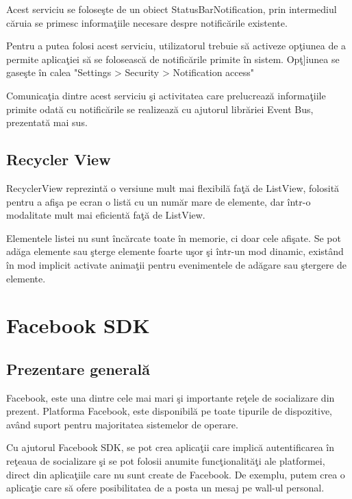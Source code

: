 	Acest serviciu se folose\c{s}te de un obiect StatusBarNotification, prin intermediul c\u{a}ruia se primesc informa\c{t}iile necesare despre notific\u{a}rile existente.

	Pentru a putea folosi acest serviciu, utilizatorul trebuie s\u{a} activeze op\c{t}iunea de a permite aplica\c{t}iei s\u{a} se foloseasc\u{a} de notific\u{a}rile primite \^{i}n sistem. Op\c{t]}iunea se gase\c{s}te \^{i}n calea "Settings > Security > Notification access"

Comunica\c{t}ia dintre acest serviciu \c{s}i activitatea care prelucreaz\u{a} informa\c{t}iile primite odat\u{a} cu notific\u{a}rile se realizeaz\u{a} cu ajutorul libr\u{a}riei Event Bus, prezentat\u{a} mai sus.

\subsection{Recycler View}

RecyclerView reprezint\u{a} o versiune mult mai flexibil\u{a} fa\c{t}\u{a} de ListView, folosit\u{a} pentru a afi\c{s}a pe ecran o list\u{a} cu un num\u{a}r mare de elemente, dar \^{i}ntr-o modalitate mult mai eficient\u{a} fa\c{t}\u{a} de ListView.

	Elementele listei nu sunt \^{i}nc\u{a}rcate toate \^{i}n memorie, ci doar cele afi\c{s}ate. Se pot ad\u{a}ga elemente sau \c{s}terge elemente foarte u\c{s}or \c{s}i \^{i}ntr-un mod dinamic, exist\^{a}nd \^{i}n mod implicit activate anima\c{t}ii pentru evenimentele de ad\u{a}gare sau \c{s}tergere de elemente.  


\section{Facebook SDK}

\subsection{Prezentare general\u{a}}
\label{facebookSDK}
Facebook, este una dintre cele mai mari \c{s}i importante re\c{t}ele de socializare din prezent. Platforma Facebook, este disponibil\u{a} pe toate tipurile de dispozitive, av\^{a}nd suport pentru majoritatea sistemelor de operare.

	Cu ajutorul Facebook SDK, se pot crea aplica\c{t}ii care implic\u{a} autentificarea \^{i}n re\c{t}eaua de socializare \c{s}i se pot folosii anumite func\c{t}ionalit\u{a}\c{t}i ale platformei, direct din aplica\c{t}iile care nu sunt create de Facebook. De exemplu, putem crea o aplica\c{t}ie care s\u{a} ofere posibilitatea de a posta un mesaj pe wall-ul personal. 

